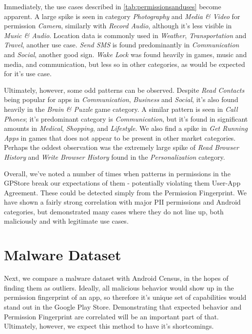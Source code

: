 Immediately, the use cases described in \ref{tab:permissionsanduses} become apparent. A large spike is seen in category \textit{Photography} and \textit{Media \& Video} for permission \textit{Camera}, similarly with \textit{Record Audio}, although it's less visible in \textit{Music \& Audio}. Location data is commonly used in \textit{Weather}, \textit{Transportation} and \textit{Travel}, another use case. \textit{Send SMS} is found predominantly in \textit{Communication} and \textit{Social}, another good sign. \textit{Wake Lock} was found heavily in games, music and media, and communication, but less so in other categories, as would be expected for it's use case.

Ultimately, however, some odd patterns can be observed. Despite \textit{Read Contacts} being popular for apps in \textit{Communication}, \textit{Business} and \textit{Social}, it's also found heavily in the \textit{Brain \& Puzzle} game category. A similar pattern is seen in \textit{Call Phones}; it's predominant category is \textit{Communication}, but it's found in significant amounts in \textit{Medical}, \textit{Shopping}, and \textit{Lifestyle}. We also find a spike in \textit{Get Running Apps} in games that does not appear to be present in other market categories. Perhaps the oddest observation was the extremely large spike of \textit{Read Browser History} and \textit{Write Browser History} found in the \textit{Personalization} category.


Overall, we've noted a number of times when patterns in permissions in the GPStore break our expectations of them - potentially violating them User-App Agreement. These could be detected simply from the Permission Fingerprint. We have shown a fairly strong correlation with major PII permissions and Android categories, but demonstrated many cases where they do not line up, both maliciously and with legitimate use cases.






\section{Malware Dataset}
Next, we compare a malware dataset with Android Census, in the hopes of finding them as outliers. Ideally, all malicious behavior would show up in the permission fingerprint of an app, so therefore it's unique set of capabilities would stand out in the Google Play Store. Demonstrating that expected behavior and Permission Fingerprint are correlated will be an important part of that. Ultimately, however, we expect this method to have it's shortcomings.



